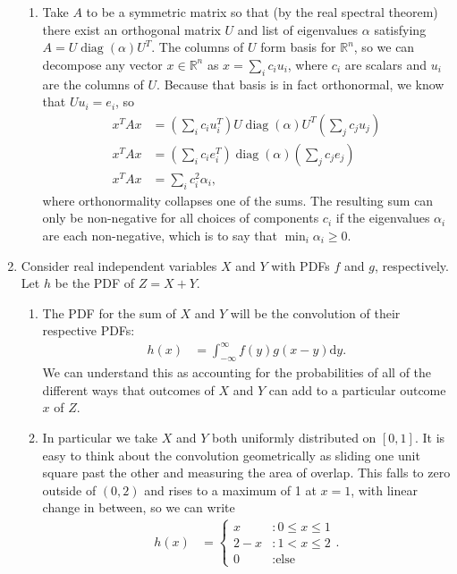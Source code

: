 \documentclass[11pt,letterpaper]{article}
\DeclareMathOperator{\diag}{diag}
\renewcommand{\d}{\mathrm{d}}
\numberwithin{equation}{section}
\numberwithin{figure}{section}
\begin{document}
\begin{enumerate}
\begin{enumerate}
		\item Take $A$ to be a symmetric matrix so that (by the real spectral theorem) there exist an orthogonal matrix $U$ and list of eigenvalues $\alpha$ satisfying $A = U \diag(\alpha) U^T$. The columns of $U$ form basis for $\mathbb{R}^n$, so we can decompose any vector $x\in\mathbb{R}^n$ as $x = \sum_i c_i u_i$, where $c_i$ are scalars and $u_i$ are the columns of $U$. Because that basis is in fact orthonormal, we know that $Uu_i = e_i$, so
		\begin{align*}
			x^T A x &= \left(\sum_{i} c_i u_i^T\right) U \diag(\alpha) U^T \left(\sum_{j} c_j u_j \right)\\
			x^T A x &= \left(\sum_i c_i e_i^T\right) \diag(\alpha) \left(\sum_j c_j e_j\right)\\
			x^T A x &= \sum_i c_i^2 \alpha_i,
		\end{align*}
		where orthonormality collapses one of the sums. The resulting sum can only be non-negative for all choices of components $c_i$ if the eigenvalues $\alpha_i$ are each non-negative, which is to say that $\min_i \alpha_i \geq 0$.
	\end{enumerate}





	\item Consider real independent variables $X$ and $Y$ with PDFs $f$ and $g$, respectively. Let $h$ be the PDF of $Z = X+Y$.
	\begin{enumerate}
		\item The PDF for the sum of $X$ and $Y$ will be the convolution of their respective PDFs:
		\begin{align*}
			h(x) &= \int_{-\infty}^\infty f(y) g(x-y) \d y.
		\end{align*}
		We can understand this as accounting for the probabilities of all of the different ways that outcomes of $X$ and $Y$ can add to a particular outcome $x$ of $Z$.

		\item In particular we take $X$ and $Y$ both uniformly distributed on $[0,1]$. It is easy to think about the convolution geometrically as sliding one unit square past the other and measuring the area of overlap. This falls to zero outside of $(0,2)$ and rises to a maximum of 1 at $x=1$, with linear change in between, so we can write
		\begin{align*}
			h(x) &= \left\{\begin{array}{ll}
			x &: 0\leq x \leq 1\\
			2-x &: 1 < x \leq 2\\
			0 &: \text{else}
			\end{array}\right..
		\end{align*}



\end{enumerate}
\end{enumerate}
\end{document}
